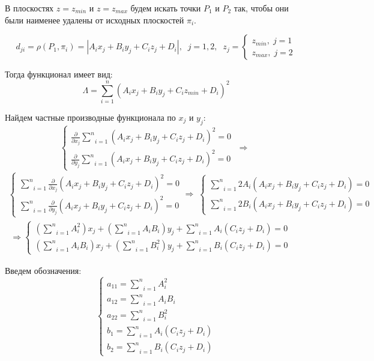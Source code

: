 В плоскостях $z = z_{min}$ и $z = z_{max}$ будем искать точки $P_1$ и $P_2$ так, чтобы они были наименее удалены от исходных плоскостей $\pi_i$.

$$d_{ji} = \rho \left( P_1, \pi_i \right) = |A_i x_j + B_i y_j + C_i z_j + D_i|, \;\; j = 1,2, \;\; z_j = \begin{cases}
	z_{min}, \; j = 1 \\
	z_{max}, \; j = 2
\end{cases}$$

Тогда функционал имеет вид:
$$\Lambda = \underset{i=1}{\overset{n}{\sum}}(A_i x_j + B_i y_j + C_i z_{min} + D_i)^2$$

Найдем частные производные функционала по $x_j$ и $y_j$:
$$\begin{cases}
	\frac{\partial}{\partial x_j} \underset{i=1}{\overset{n}{\sum}}(A_i x_j + B_i y_j + C_i z_j + D_i)^2 = 0 \\
	\frac{\partial}{\partial y_j} \underset{i=1}{\overset{n}{\sum}}(A_i x_j + B_i y_j + C_i z_j + D_i)^2 = 0
\end{cases}\; \Rightarrow \; $$
$$\begin{gathered}
	\begin{cases}
		\underset{i=1}{\overset{n}{\sum}}\frac{\partial}{\partial x_j}(A_i x_j + B_i y_j + C_i z_j + D_i)^2 = 0 \\
		\underset{i=1}{\overset{n}{\sum}}\frac{\partial}{\partial y_j}(A_i x_j + B_i y_j + C_i z_j + D_i)^2 = 0
	\end{cases} \Rightarrow \; 
	\begin{cases}
		\underset{i=1}{\overset{n}{\sum}}2A_i (A_i x_j + B_i y_j + C_i z_j + D_i) = 0 \\
		\underset{i=1}{\overset{n}{\sum}}2B_i (A_i x_j + B_i y_j + C_i z_j + D_i) = 0
	\end{cases}\\
	\; \Rightarrow \begin{cases}
		\left( \underset{i=1}{\overset{n}{\sum}} A_i^2 \right) x_j + \left( \underset{i=1}{\overset{n}{\sum}} A_i B_i \right) y_j + \underset{i=1}{\overset{n}{\sum}}A_i (C_i z_j + D_i) = 0 \\
		\left( \underset{i=1}{\overset{n}{\sum}} A_i B_i \right) x_j + \left( \underset{i=1}{\overset{n}{\sum}} B_i^2 \right) y_j + \underset{i=1}{\overset{n}{\sum}}B_i (C_i z_j + D_i) = 0
	\end{cases}
\end{gathered}$$

Введем обозначения:
$$\begin{cases}
	a_{11} = \underset{i=1}{\overset{n}{\sum}} A_i^2 \\
	a_{12} = \underset{i=1}{\overset{n}{\sum}} A_i B_i \\
	a_{22} = \underset{i=1}{\overset{n}{\sum}} B_i^2 \\
	b_1 = \underset{i=1}{\overset{n}{\sum}}A_i (C_i z_j + D_i) \\
	b_2 = \underset{i=1}{\overset{n}{\sum}}B_i (C_i z_j + D_i)
\end{cases}$$

